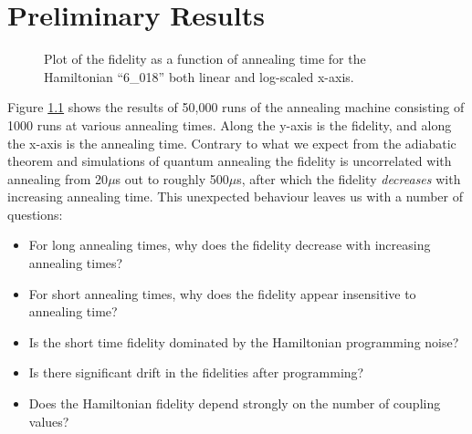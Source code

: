 \chapter{Preliminary Results}

\begin{figure}[h]
	\caption[Fidelity vs Time]{Plot of the fidelity as a function of annealing time for the Hamiltonian ``6\_018'' both linear and log-scaled x-axis.}
	\label{fig:fidelity}
\end{figure}

Figure \ref{fig:fidelity} shows the results of 50,000 runs of the annealing machine consisting of 1000 runs at various annealing times.  Along the y-axis is the fidelity, and along the x-axis is the annealing time.  Contrary to what we expect from the adiabatic theorem and simulations of quantum annealing the fidelity is uncorrelated with annealing from 20$\mu$s out to roughly 500$ \mu$s, after which the fidelity \emph{decreases} with increasing annealing time.  This unexpected behaviour leaves us with a number of questions:

\begin{itemize}
	\item For long annealing times, why does the fidelity decrease with increasing annealing times?
	\item For short annealing times, why does the fidelity appear insensitive to annealing time?
	\item Is the short time fidelity dominated by the Hamiltonian programming noise?
	\item Is there significant drift in the fidelities after programming?
	\item Does the Hamiltonian fidelity depend strongly on the number of coupling values?
\end{itemize}


